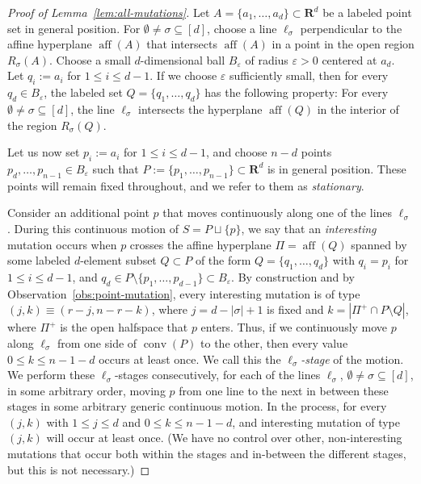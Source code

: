 \documentclass[a4paper,USenglish,cleveref, autoref, thm-restate,nolineno]{socg-lipics-v2021}
\DeclareMathOperator{\conv}{conv}
\DeclareMathOperator{\aff}{aff}
\renewcommand{\leq}{\leqslant}
\newcommand{\R}{\mathbf{R}}
\begin{document}
\begin{proof}[Proof of Lemma~\ref{lem:all-mutations}] 
Let $A=\{a_1,\dots,a_d\} \subset \R^d$ be a labeled point set in general position. 
For $\emptyset \neq \sigma \subseteq [d]$, choose a line $\ell_\sigma$ perpendicular to the affine hyperplane $\aff(A)$ that intersects $\aff(A)$ in a point in the open region $R_\sigma(A)$. 
Choose a small $d$-dimensional ball $B_\varepsilon$ of radius $\varepsilon>0$ centered at $a_d$. Let $q_i:= a_i$ for $1\leq i\leq d-1$. If we choose $\varepsilon$ sufficiently small, then for every $q_d\in B_\varepsilon$, the labeled set 
$Q=\{q_1,\dots,q_d\}$ has the following property: For every $\emptyset \neq \sigma \subseteq [d]$, the line $\ell_\sigma$ intersects the hyperplane $\aff(Q)$ in the interior of the region $R_\sigma(Q)$.  

Let us now set $p_i:=a_i$ for $1\leq i \leq d-1$, and choose 
$n-d$ points $p_d,\dots,p_{n-1} \in B_{\varepsilon}$ such that $P:=\{p_1,\dots,p_{n-1}\} \subset \R^d$ is in general position. These points will remain fixed throughout, and we refer to them as \emph{stationary}. 

Consider an additional point $p$ that moves continuously along one of the lines $\ell_\sigma$. During this continuous motion of $S=P\sqcup\{p\}$, we say that an \emph{interesting} mutation occurs when $p$ crosses the affine hyperplane $\Pi=\aff(Q)$ spanned by some labeled $d$-element subset $Q\subset P$ of the form $Q=\{q_1,\dots,q_d\}$ with $q_i=p_i$ for $1\leq i\leq d-1$, and $q_d\in P\setminus \{p_1,\dots, p_{d-1}\} \subset B_{\varepsilon}$. By construction and by Observation~\ref{obs:point-mutation}, every interesting mutation is of type $(j,k)\equiv (r-j,n-r-k)$, where $j=d-|\sigma|+1$ is fixed and $k=|\Pi^+ \cap P\setminus Q|$, where $\Pi^+$ is the open halfspace that $p$ enters. Thus, if we continuously move  $p$ along $\ell_\sigma$ from one side of $\conv(P)$ to the other, then every value $0\leq k \leq n-1-d$ occurs at least once. We call this the \emph{$\ell_\sigma$-stage} of the motion. We perform these $\ell_\sigma$-stages consecutively, for each of the lines $\ell_\sigma$, $\emptyset \neq \sigma \subseteq [d]$, in some arbitrary order, moving $p$ from one line to the next in between these stages in some arbitrary generic continuous motion. In the process, for every $(j,k)$ with $1\leq j \leq d$ and $0\leq k \leq n-1-d$, and interesting mutation of type $(j,k)$ will occur at least once. (We have no control over other, non-interesting mutations that occur both within the stages and in-between the different stages, but this is not necessary.)
\end{proof}
\end{document}
